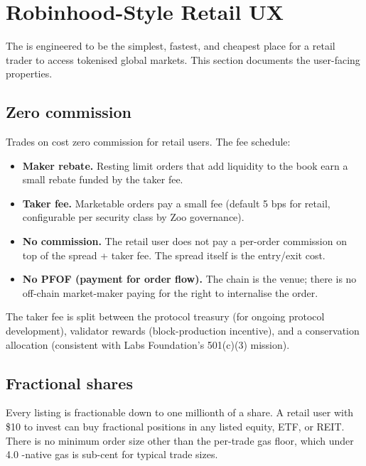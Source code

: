\section{Robinhood-Style Retail UX}
\label{sec:retail-ux}

The \Zoo{} \DEX{} is engineered to be the simplest, fastest, and
cheapest place for a retail trader to access tokenised global markets.
This section documents the user-facing properties.

\subsection{Zero commission}

Trades on \Zoo{} \DEX{} cost zero commission for retail users. The
fee schedule:

\begin{itemize}[leftmargin=1.2em]
  \item \textbf{Maker rebate.} Resting limit orders that add
        liquidity to the book earn a small rebate funded by the
        taker fee.
  \item \textbf{Taker fee.} Marketable orders pay a small fee
        (default 5 bps for retail, configurable per security class
        by Zoo \DAO{} governance).
  \item \textbf{No commission.} The retail user does not pay a
        per-order commission on top of the spread + taker fee.
        The spread itself is the entry/exit cost.
  \item \textbf{No PFOF (payment for order flow).} The chain is the
        venue; there is no off-chain market-maker paying for the
        right to internalise the order.
\end{itemize}

The taker fee is split between the protocol treasury (for ongoing
protocol development), validator rewards (block-production
incentive), and a conservation allocation (consistent with \Zoo{}
Labs Foundation's 501(c)(3) mission).

\subsection{Fractional shares}

Every listing is fractionable down to one millionth of a share. A
retail user with \$10 to invest can buy fractional positions in any
listed equity, ETF, or REIT. There is no minimum order size other
than the per-trade gas floor, which under \Zoo{} 4.0 \GPU{}-native
gas is sub-cent for typical trade sizes.

